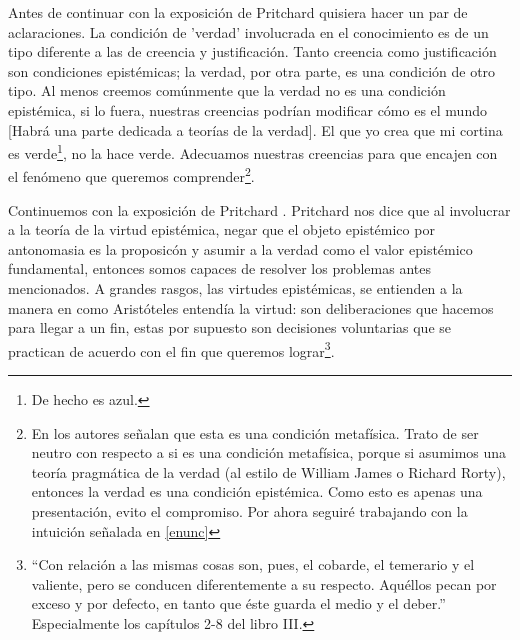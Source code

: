\documentclass{article}
\begin{document}
Antes de continuar con la exposición de Pritchard quisiera hacer un par de aclaraciones. La condición de 'verdad' involucrada en el conocimiento es de un tipo diferente a las de creencia y justificación. Tanto creencia como justificación son condiciones epistémicas; la verdad, por otra parte, es una condición de otro tipo. Al menos creemos comúnmente que la verdad no es una condición epistémica, si lo fuera, nuestras creencias podrían modificar cómo es el mundo [Habrá una parte dedicada a teorías de la verdad]. El que yo crea que mi cortina es verde\footnote{De hecho es azul.}, no la hace verde. Adecuamos nuestras creencias para que encajen con el fenómeno que queremos comprender\footnote{En \cite{sep-knowledge-analysis} los autores señalan que esta es una condición metafísica. Trato de ser neutro con respecto a si es una condición metafísica, porque si asumimos una teoría pragmática de la verdad (al estilo de William James o Richard Rorty), entonces la verdad es una condición epistémica. Como esto es apenas una presentación, evito el compromiso. Por ahora seguiré trabajando con la intuición señalada en \ref{enunc}}.  

Continuemos con la exposición de Pritchard \cite{Pritchard2021}. Pritchard nos dice que al involucrar a la teoría de la virtud epistémica, negar que el objeto epistémico por antonomasia es la proposicón y asumir a la verdad como el valor epistémico fundamental, entonces somos capaces de resolver los problemas antes mencionados. A grandes rasgos, las virtudes epistémicas, se entienden a la manera en como Aristóteles entendía la virtud: son deliberaciones que hacemos para llegar a un fin, estas por supuesto son decisiones voluntarias que se practican de acuerdo con el fin que queremos lograr\footnote{``Con relación a las mismas cosas son, pues, el cobarde, el temerario y el valiente, pero se conducen diferentemente a su respecto. Aquéllos pecan por exceso y por defecto, en tanto que éste guarda el medio y el deber.'' \cite{aristotelesnico} Especialmente los capítulos 2-8 del libro III.}. 
\end{document}
